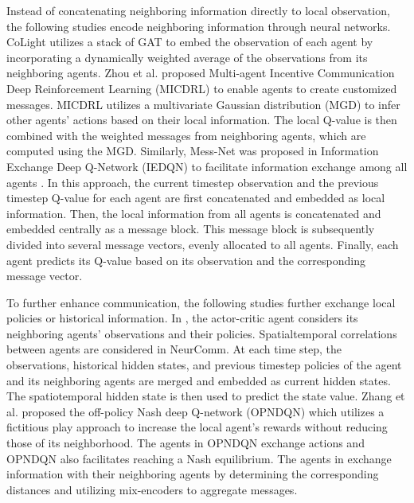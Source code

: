 Instead of concatenating neighboring information directly to local observation, the following studies encode neighboring information through neural networks.  
CoLight utilizes a stack of GAT to embed the observation of each agent by incorporating a dynamically weighted average of the observations from its neighboring agents\cite{wei2019colight}. 
Zhou et al. proposed Multi-agent Incentive Communication Deep Reinforcement Learning (MICDRL) to enable agents to create customized messages\cite{zhou2024cooperative}. MICDRL utilizes a multivariate Gaussian distribution (MGD) to infer other agents' actions based on their local information. The local Q-value is then combined with the weighted messages from neighboring agents, which are computed using the MGD.
Similarly, Mess-Net was proposed in Information Exchange Deep Q-Network (IEDQN) to facilitate information exchange among all agents \cite{xie2020iedqn}. In this approach, the current timestep observation and the previous timestep Q-value for each agent are first concatenated and embedded as local information. Then, the local information from all agents is concatenated and embedded centrally as a message block. This message block is subsequently divided into several message vectors, evenly allocated to all agents. Finally, each agent predicts its Q-value based on its observation and the corresponding message vector.

To further enhance communication, the following studies further exchange local policies or historical information.
In \cite{wang2021traffic}, the actor-critic agent considers its neighboring agents' observations and their policies.
Spatialtemporal correlations between agents are considered in NeurComm\cite{chu2020multi}. At each time step, the observations, historical hidden states, and previous timestep policies of the agent and its neighboring agents are merged and embedded as current hidden states. The spatiotemporal hidden state is then used to predict the state value.
Zhang et al. proposed the off-policy Nash deep Q-network (OPNDQN) which utilizes a fictitious play approach to increase the local agent's rewards without reducing those of its neighborhood\cite{zhang2023large}. The agents in OPNDQN exchange actions and OPNDQN also facilitates reaching a Nash equilibrium.
The agents in \cite{li2023adaptive} exchange information with their neighboring agents by determining the corresponding distances and utilizing mix-encoders to aggregate messages. 

